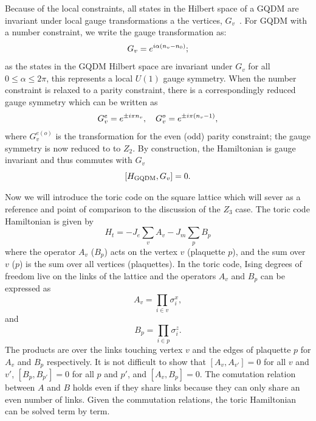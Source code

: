 \documentclass[twocolumn,prb,aps,floatfix,superscriptaddress]{revtex4-1}
\begin{document}
Because of the local constraints, all states in the Hilbert space of a GQDM are invariant under local gauge transformations a the vertices, $G_v$~\cite{Moessner2001}. For GQDM with a number constraint, we write the gauge transformation as:
\begin{equation}
G_v = e^{i \alpha \left( n_v -n_0 \right)}; \notag
\end{equation}
as the states in the GQDM Hilbert space are invariant under $G_v$ for all $0 \leq \alpha \leq 2 \pi$, this represents a local $U(1)$ gauge symmetry. When the number constraint is relaxed to a parity constraint, there is a correspondingly reduced gauge symmetry which can be written as
\begin{equation}
G_v^e = e^{\pm i \pi n_v}, \quad G_v^o = e^{\pm i \pi \left(n_v-1\right)}, \notag
\end{equation}
where $G^{e\left(o\right)}_v$ is the transformation for the even (odd) parity constraint; the gauge symmetry is now reduced to to $Z_2$.
By construction, the Hamiltonian is gauge invariant and thus commutes with $G_v$
\begin{equation}
\left[ H_{\rm{GQDM}}, G_v \right] = 0. \notag
\end{equation}



    Now we will introduce the toric code on the square lattice which will sever as a reference and
    point of comparison to the discussion of the $Z_3$ case. The toric code Hamiltonian is given by
    \begin{equation}
        H_t = -J_e\sum_v A_v - J_m\sum_p B_p
        \label{eqn:toric_code_ham}
    \end{equation}
    where the operator $A_v$ ($B_p$) acts on the vertex $v$ (plaquette $p$), and the sum over $v$ ($p$) 
    is the sum over all vertices (plaquettes). 
    In the toric code, Ising degrees of freedom live on the links of the
    lattice and the operators $A_v$ and $B_p$ can be expressed as
    \begin{equation}
        A_v = \prod_{i\in v} \sigma^x_i
        ,
    \end{equation}
    and
    \begin{equation}
        B_p = \prod_{i\in p} \sigma^z_i
        .
    \end{equation}
    The products are over the links touching vertex $v$ and the edges of plaquette $p$ for
    $A_v$ and $B_p$ respectively. It is not difficult to show that 
    $[A_v,A_{v'}]=0$ for all $v$ and $v'$, 
    $[B_p,B_{p'}]=0$ for all $p$ and $p'$, and $[A_v,B_p]=0$. The comutation relation between $A$
    and $B$ holds even if they share links because they
    can only share an even number of links. Given the commutation relations,
    the toric Hamiltonian can be solved term by term.
\end{document}
